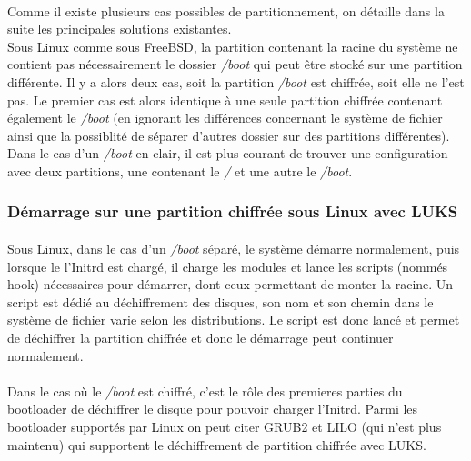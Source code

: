 \paragraph{}
Comme il existe plusieurs cas possibles de partitionnement, on détaille dans la
suite les principales solutions existantes.
\\
Sous Linux comme sous FreeBSD, la partition contenant la racine du système ne
contient pas nécessairement le dossier {\em /boot} qui peut être stocké sur une
partition différente. Il y a alors deux cas, soit la partition {\em /boot} est
chiffrée, soit elle ne l'est pas. Le premier cas est alors identique à une seule
partition chiffrée contenant également le {\em /boot} (en ignorant les
différences concernant le système de fichier ainsi que la possiblité de séparer
d'autres dossier sur des partitions différentes). Dans le cas d'un {\em /boot}
en clair, il est plus courant de trouver une configuration avec deux partitions,
une contenant le {\em /} et une autre le {\em /boot}.

\subsubsection{Démarrage sur une partition chiffrée sous Linux avec LUKS}

\paragraph{}
Sous Linux, dans le cas d'un {\em /boot} séparé, le système démarre normalement,
puis lorsque le l'Initrd est chargé, il charge les modules et lance les scripts
(nommés hook) nécessaires pour démarrer, dont ceux permettant de monter la
racine. Un script est dédié au déchiffrement des disques, son nom et son chemin
dans le système de fichier varie selon les distributions. Le script est donc
lancé et permet de déchiffrer la partition chiffrée et donc le démarrage
peut continuer normalement.

\paragraph{}
Dans le cas où le {\em /boot} est chiffré, c'est le rôle des premieres parties
du bootloader de déchiffrer le disque pour pouvoir charger l'Initrd. Parmi les
bootloader supportés par Linux on peut citer GRUB2 et LILO
(qui n'est plus maintenu) qui supportent le déchiffrement de partition chiffrée
avec LUKS.

